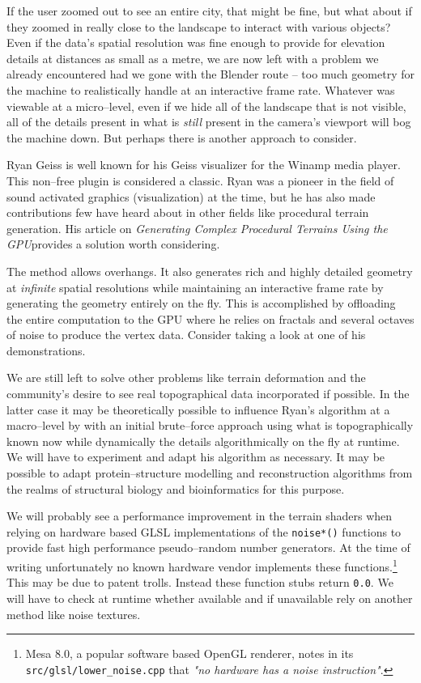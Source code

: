 If the user zoomed out to see an entire city, that might be fine, but what about if they zoomed in really close to the landscape to interact with various objects? Even if the data's spatial resolution was fine enough to provide for elevation details at distances as small as a metre, we are now left with a problem we already encountered had we gone with the Blender route -- too much geometry for the machine to realistically handle at an interactive frame rate. Whatever was viewable at a micro--level, even if we hide all of the landscape that is not visible, all of the details present in what is {\it still} present in the camera's viewport will bog the machine down. But perhaps there is another approach to consider.

Ryan Geiss is well known for his Geiss visualizer for the Winamp media player. This non--free plugin is considered a classic. Ryan was a pioneer in the field of sound activated graphics (visualization) at the time, but he has also made contributions few have heard about in other fields like procedural terrain generation. His article on {\it Generating Complex Procedural Terrains Using the GPU} provides a solution worth considering.

The method allows overhangs. It also generates rich and highly detailed geometry at {\it infinite} spatial resolutions while maintaining an interactive frame rate by generating the geometry entirely on the fly. This is accomplished by offloading the entire computation to the GPU where he relies on fractals and several octaves of noise to produce the vertex data. Consider taking a look at one of his demonstrations.

We are still left to solve other problems like terrain deformation and the community's desire to see real topographical data incorporated if possible. In the latter case it may be theoretically possible to influence Ryan's algorithm at a macro--level by  with an initial brute--force approach using what is topographically known now while dynamically  the details algorithmically on the fly at runtime. We will have to experiment and adapt his algorithm as necessary. It may be possible to adapt protein--structure modelling and reconstruction algorithms from the realms of structural biology and bioinformatics for this purpose.

We will probably see a performance improvement in the terrain shaders when relying on hardware based GLSL implementations of the {\tt noise*()} functions to provide fast high performance pseudo--random number generators. At the time of writing unfortunately no known hardware vendor implements these functions.\footnote{Mesa 8.0, a popular software based OpenGL renderer, notes in its {\tt src/glsl/lower_noise.cpp} that {\it "no hardware has a noise instruction"}.} This may be due to patent trolls. Instead these function stubs return {\tt 0.0}. We will have to check at runtime whether available and if unavailable rely on another method like noise textures.


